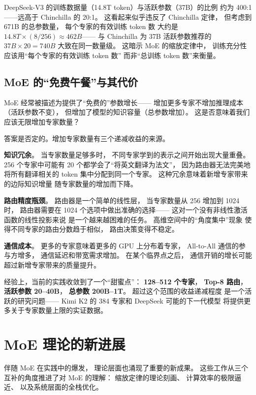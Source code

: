 DeepSeek-V3 的训练数据量（14.8T token）与活跃参数（37B）的比例
约为 400:1——远高于 Chinchilla 的 20:1。
这看起来似乎违反了 Chinchilla 定律，
但考虑到 671B 的总参数量，
每个专家的有效训练 token 数
大约是 $14.8T \times (8/256) \approx 462B$——
与 Chinchilla 为 37B 活跃参数推荐的
$37B \times 20 = 740B$ 大致在同一数量级。
这暗示 MoE 的缩放定律中，
训练充分性应该用“每个专家的有效训练 token 数”
而非“总训练 token 数”来衡量。

\subsection{MoE 的“免费午餐”与其代价}

MoE 经常被描述为提供了“免费的”参数增长——
增加更多专家不增加推理成本（活跃参数不变），
但增加了模型的知识容量（总参数增加）。
这是否意味着我们应该无限增加专家数量？

答案是否定的。增加专家数量有三个递减收益的来源。

\textbf{知识冗余}。
当专家数量足够多时，
不同专家学到的表示之间开始出现大量重叠。
256 个专家中可能有 20 个都学会了“将英文翻译为法文”，
因为路由器无法完美地将所有翻译相关的 token
集中分配到同一个专家。
这种冗余意味着新增专家带来的边际知识增量
随专家数量的增加而下降。

\textbf{路由精度瓶颈}。
路由器是一个简单的线性层，
当专家数量从 256 增加到 1024 时，
路由器需要在 1024 个选项中做出准确的选择——
这对一个没有非线性激活函数的线性投影来说
是一个越来越困难的任务。
高维空间中的“角度集中”现象
使得不同专家的路由分数趋于相似，
路由决策变得不稳定。

\textbf{通信成本}。
更多的专家意味着更多的 GPU 上分布着专家，
All-to-All 通信的参与方增多，
通信延迟和带宽需求增加。
在某个临界点之后，
通信开销的增长可能超过新增专家带来的质量提升。

经验上，当前的实践收敛到了一个“甜蜜点”：
\textbf{128--512 个专家}，
\textbf{Top-8 路由}，
\textbf{活跃参数 20--40B}，
\textbf{总参数 200B--1T}。
超过这个范围的收益递减程度
是一个活跃的研究问题——
Kimi K2 的 384 专家和 DeepSeek 可能的下一代模型
将提供更多关于专家数量上限的实证数据。

\section{MoE 理论的新进展}
\label{sec:moe-theory-2026}

伴随 MoE 在实践中的爆发，
理论层面也涌现了重要的新成果。
这些工作从三个互补的角度推进了对 MoE 的理解：
缩放定律的理论刻画、
计算效率的极限逼近、
以及系统层面的全栈优化。

